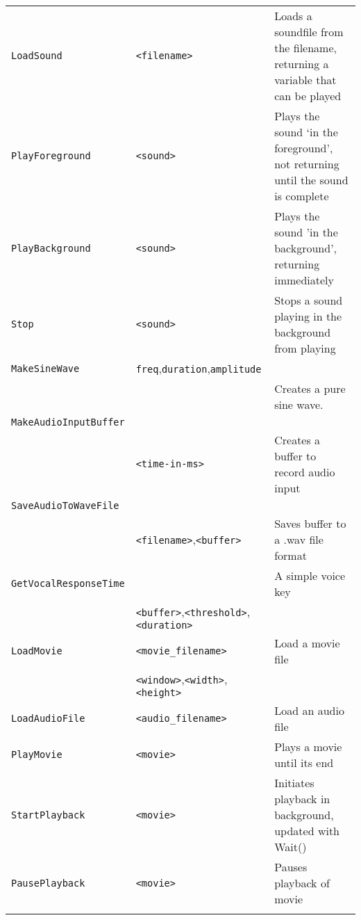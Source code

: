 \begin{longtable}{p{3cm}p{3cm}p{6cm}}
\verb+LoadSound+ &\verb+<filename>+ &Loads a soundfile from the filename, returning a variable that can be played\\ 
\verb+PlayForeground+ &\verb+<sound>+ &Plays the sound `in the foreground', not returning until the sound is complete\\ 
\verb+PlayBackground+ &\verb+<sound>+ &Plays the sound 'in the background', returning immediately\\ 
\verb+Stop+ &\verb+<sound>+ &Stops a sound playing in the background from playing\\ 

\verb+MakeSineWave+ & \verb+freq+,\verb+duration+,\verb+amplitude+\\
&& Creates a pure sine wave.\\ 

\verb+MakeAudioInputBuffer+ \\
& \verb+<time-in-ms>+ &Creates a buffer to record audio input\\

\verb+SaveAudioToWaveFile+ \\
& \verb+<filename>+,\verb+<buffer>+  & Saves buffer to a .wav file format\\

\verb+GetVocalResponseTime+ & &A simple voice key\\
 &\verb+<buffer>+,\verb+<threshold>+,\verb+<duration>+ \\

\verb+LoadMovie+ &\verb+<movie_filename>+ &Load a movie file\\
 &\verb+<window>+,\verb+<width>+,\verb+<height>+ \\
\verb+LoadAudioFile+ &\verb+<audio_filename>+ &Load an audio file\\

\verb+PlayMovie+&\verb+<movie>+ &Plays a movie until its end\\
\verb+StartPlayback+&\verb+<movie>+&Initiates playback in background, updated with Wait()\\
\verb+PausePlayback+&\verb+<movie>+&Pauses playback of movie\\



\addlinespace[0.2cm] 


\end{longtable}
